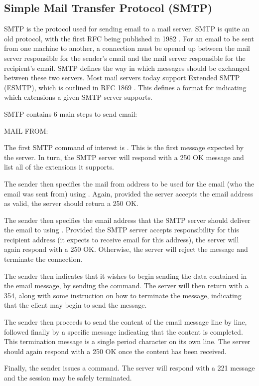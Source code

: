 \subsection{Simple Mail Transfer Protocol (SMTP)} \label{sec:smtp}
SMTP is the protocol used for sending email to a mail server. SMTP is quite an old protocol, with the first RFC being published in 1982 \cite{smtpRfc}. For an email to be sent from one machine to another, a connection must be opened up between the mail server responsible for the sender's email and the mail server responsible for the recipient's email. SMTP defines the way in which messages should be exchanged between these two servers. Most mail servers today support 
Extended SMTP (ESMTP), which is outlined in RFC 1869 \cite{esmtpRfc}. This defines a format for indicating which extensions a given SMTP server supports. 

SMTP contains 6 main steps to send email:
\begin{labeling}{MAIL FROM: }
  \item[EHLO] The first SMTP command of interest is . This is the first message expected by the server. In turn, the SMTP server will respond with a 250 OK message and list all of the extensions it supports. 
  \item[MAIL FROM:] The sender then specifies the mail from address to be used for the email (who the email was sent from) using . Again, provided the server accepts the email address as valid, the server should return a 250 OK.
  \item[RCPT TO:] The sender then specifies the email address that the SMTP server should deliver the email to using . Provided the SMTP server accepts responsibility for this recipient address (it expects to receive email for this address), the server will again respond with a 250 OK. Otherwise, the server will reject the message and terminate the connection.
  \item[DATA] The sender then indicates that it wishes to begin sending the data contained in the email message, by sending the  command. The server will then return with a 354, along with some instruction on how to terminate the message, indicating that the client may begin to send the message.
  \item[<content>] The sender then proceeds to send the content of the email message line by line, followed finally by a specific message indicating that the content is completed. This termination message is a single period character on its own line. The server should again respond with a 250 OK once the content has been received.
  \item[QUIT] Finally, the sender issues a  command. The server will respond with a 221 message and the session may be safely terminated.
\end{labeling}


